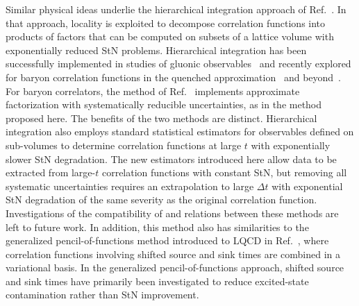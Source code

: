 Similar physical ideas underlie the hierarchical integration approach of Ref.~\cite{Luscher:2001up}. 
In that approach, locality is exploited to decompose correlation functions into products of factors that can be computed on 
subsets of a lattice volume with exponentially reduced StN problems. 
Hierarchical integration has been successfully implemented in studies of gluonic observables~\cite{Meyer:2002cd,DellaMorte:2007zz,DellaMorte:2008jd,DellaMorte:2010yp,Vera:2016xpp} and recently explored for baryon correlation functions in the 
quenched approximation~\cite{Ce:2016idq} and beyond~\cite{Ce:2016ajy}. 
For baryon correlators, the method of Ref.~\cite{Ce:2016idq} implements approximate factorization with systematically 
reducible uncertainties, as in the method proposed here. 
The benefits of the two methods are distinct.
  Hierarchical integration also employs standard statistical estimators for observables defined on sub-volumes to determine correlation functions at large $t$ with exponentially slower StN degradation.
  The new estimators introduced here allow data to be extracted from large-$t$ correlation functions with constant StN, but removing all systematic uncertainties requires an extrapolation to large $\Delta t$ with exponential StN degradation of the same severity as the original correlation function.
  Investigations of the compatibility of and relations between these methods are left to future work.
In addition, this method also has similarities to the generalized pencil-of-functions method introduced to LQCD in 
Ref.~\cite{Aubin:2010jc}, where correlation functions involving shifted source and sink times are combined in a variational basis.
 In the generalized pencil-of-functions approach, shifted source and sink times have primarily been investigated to reduce 
 excited-state contamination rather than StN improvement.



